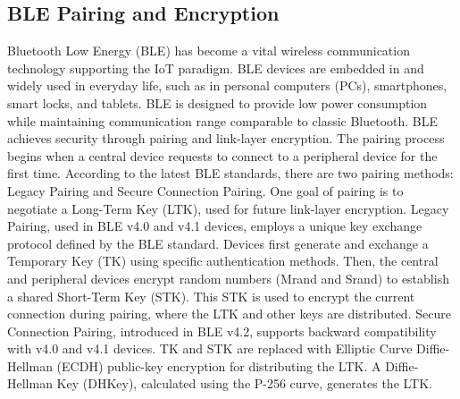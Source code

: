 \documentclass{article}
\begin{document}
\subsection{ BLE Pairing and Encryption}
Bluetooth Low Energy (BLE) has become a vital wireless communication technology supporting the IoT paradigm. BLE devices are embedded in and widely used in everyday life, such as in personal computers (PCs), smartphones, smart locks, and tablets. BLE is designed to provide low power consumption while maintaining communication range comparable to classic Bluetooth. BLE achieves security through pairing and link-layer encryption.
The pairing process begins when a central device requests to connect to a peripheral device for the first time. According to the latest BLE standards, there are two pairing methods: Legacy Pairing and Secure Connection Pairing. One goal of pairing is to negotiate a Long-Term Key (LTK), used for future link-layer encryption. Legacy Pairing, used in BLE v4.0 and v4.1 devices, employs a unique key exchange protocol defined by the BLE standard. Devices first generate and exchange a Temporary Key (TK) using specific authentication methods. Then, the central and peripheral devices encrypt random numbers (Mrand and Srand) to establish a shared Short-Term Key (STK). This STK is used to encrypt the current connection during pairing, where the LTK and other keys are distributed. Secure Connection Pairing, introduced in BLE v4.2, supports backward compatibility with v4.0 and v4.1 devices. TK and STK are replaced with Elliptic Curve Diffie-Hellman (ECDH) public-key encryption for distributing the LTK. A Diffie-Hellman Key (DHKey), calculated using the P-256 curve, generates the LTK.
\end{document}

